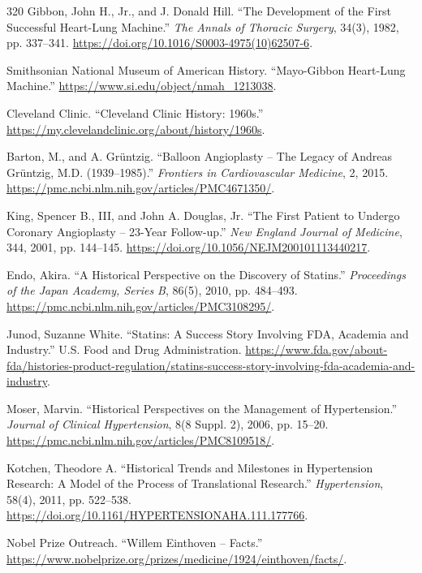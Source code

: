 \documentclass[12pt,oneside]{book}
\begin{document}
\begin{thebibliography}{320}
Gibbon, John H., Jr., and J. Donald Hill. ``The Development of the First
Successful Heart-Lung Machine.'' \emph{The Annals of Thoracic Surgery},
34(3), 1982, pp. 337--341.
\url{https://doi.org/10.1016/S0003-4975(10)62507-6}.

Smithsonian National Museum of American History. ``Mayo-Gibbon Heart-Lung
Machine.'' \url{https://www.si.edu/object/nmah_1213038}.

Cleveland Clinic. ``Cleveland Clinic History: 1960s.''
\url{https://my.clevelandclinic.org/about/history/1960s}.

Barton, M., and A. Grüntzig. ``Balloon Angioplasty -- The Legacy of Andreas
Grüntzig, M.D. (1939--1985).'' \emph{Frontiers in Cardiovascular Medicine},
2, 2015. \url{https://pmc.ncbi.nlm.nih.gov/articles/PMC4671350/}.

King, Spencer B., III, and John A. Douglas, Jr. ``The First Patient to
Undergo Coronary Angioplasty -- 23-Year Follow-up.'' \emph{New England
Journal of Medicine}, 344, 2001, pp. 144--145.
\url{https://doi.org/10.1056/NEJM200101113440217}.

Endo, Akira. ``A Historical Perspective on the Discovery of Statins.''
\emph{Proceedings of the Japan Academy, Series B}, 86(5), 2010,
pp. 484--493. \url{https://pmc.ncbi.nlm.nih.gov/articles/PMC3108295/}.

Junod, Suzanne White. ``Statins: A Success Story Involving FDA, Academia
and Industry.'' U.S. Food and Drug Administration.
\url{https://www.fda.gov/about-fda/histories-product-regulation/statins-success-story-involving-fda-academia-and-industry}.

Moser, Marvin. ``Historical Perspectives on the Management of
Hypertension.'' \emph{Journal of Clinical Hypertension}, 8(8 Suppl. 2), 2006,
pp. 15--20. \url{https://pmc.ncbi.nlm.nih.gov/articles/PMC8109518/}.

Kotchen, Theodore A. ``Historical Trends and Milestones in Hypertension
Research: A Model of the Process of Translational Research.''
\emph{Hypertension}, 58(4), 2011, pp. 522--538.
\url{https://doi.org/10.1161/HYPERTENSIONAHA.111.177766}.

Nobel Prize Outreach. ``Willem Einthoven -- Facts.''
\url{https://www.nobelprize.org/prizes/medicine/1924/einthoven/facts/}.


\end{thebibliography}
\end{document}
